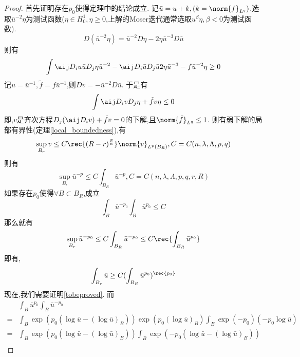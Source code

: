 \begin{proof}
\newcommand{\ub}{{\bar{u}}}
    首先证明存在$p_0$使得定理中的结论成立. 记$\ub=u+k,(k=\norm{f}_{L^q})$.选取$\ub^{-2}\eta$为测试函数($\eta \in H^1_0,\eta \ge 0$,上解的Moser迭代通常选取$u^\beta \eta, \beta <0$为测试函数).
    \begin{equation}
        D(\ub^{-2}\eta)=\ub^{-2}D\eta-2\eta \ub^{-3}D\ub
    \end{equation}
    则有
    \begin{equation}
        \int \aij D_iu \ub D_j\eta \ub^{-2}-\aij D_i\ub D_j\ub 2 \eta \ub^{-3} -f\ub^{-2}\eta \ge 0
    \end{equation}
    记$u=\ub^{-1}, \tilde{f}=f\ub^{-1}$,则$Dv=-\ub^{-2}D\ub$. 于是有
    \begin{equation}
        \int \aij D_iv D_j\eta + \tilde{f}v\eta \le 0
    \end{equation}
    即,$v$是齐次方程$D_j(\aij D_iv)+\tilde{f}v=0$的下解,且$\norm{\tilde{f}}_{L^q} \le 1$. 则有弱下解的局部有界性(定理\eqref{local_boundedness}),有
    \begin{equation}
        \sup_{B_r}v \le C\rec{(R-r)^\frac{p}{n}}\norm{v}_{L^p(B_R)}, C=C(n,\lambda,\Lambda,p,q)
    \end{equation}
    则有
    \begin{equation}
        \sup_{B_r}\ub^{-p} \le C\int_{B_R}\ub^{-p}, C=C(n,\lambda,\Lambda,p,q,r,R)
    \end{equation}
    如果存在$p_0$使得$\forall B\subset B_R$,成立
    \begin{equation}\label{tobeproved}
        \int_B \ub^{-p_0}\int_B \ub^{p_0} \le C
    \end{equation}
    那么就有
    \begin{equation}
        \sup_{B_r} \ub^{-p_0} \le C \int_{B_R}\ub^{-p_0} \le C\rec{\int_{B_R}\ub^{p_0}}
    \end{equation}
    即有,
    \begin{equation}
        \int_{B_r} \ub \ge C(\int_{B_R}\ub^{p_0})^\rec{p_0}
    \end{equation}
    现在,我们需要证明\eqref{tobeproved}. 而
    \begin{equation}
        \begin{split}
            &\int_B{\ub^{p_0}}\int_B\ub^{-p_0}  \\
            = & \int_B\exp(p_0(\log\ub-(\log\ub)_B))\exp(p_0(\log\ub)_B)\int_B\exp(-p_0)(-p_0\log\ub) \\
            =& \int_B \exp(p_0(\log\ub -(\log \ub )_B))\int_B \exp(-p_0(\log\ub-(\log\ub)_B)) \\

\end{split}
\end{equation}
\end{proof}
